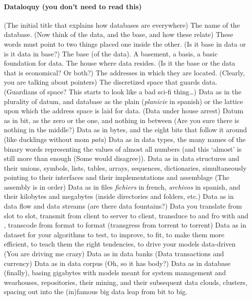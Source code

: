 




\paragraph{Dataloquy (you don't need to read this)}
(The initial title that explains how databases are everywhere) The name of the database. (Now think of the data, and the base, and how these relate) These words must point to two things placed one inside the other. (Is it base in data or is it data in base?) The base (of the data). A basement, a basis, a basic foundation for data. The house where data resides. (Is it the base or the data that is economical? Or both?) The addresses in which they are located. (Clearly, you are talking about pointers) The discretized space that guards data. (Guardians of space? This starts to look like a bad sci-fi thing\dots) Data as in the plurality of datum, and database as the plain (\textit{planicie} in spanish) or the lattice upon which the address space is laid for data. (Data under house arrest) Datum as in bit, as the zero or the one, and nothing in between (Are you sure there is nothing in the middle?) Data as in bytes, and the eight bits that follow it around (like ducklings without mom \textit{pata}) Data as in data types, the many names of the binary words representing the values of almost all numbers (and this `almost' is still more than enough (Some would disagree)). Data as in data structures and their unions, symbols, lists, tables, arrays, sequences, dictionaries, simultaneously pointing to their interfaces and their implementations and assemblage (The assembly is in order) Data as in files \textit{fichiers} in french, \textit{archivos} in spanish, and their kilobytes and megabytes (inside directories and folders, etc.) Data as in data flow and data streams (are there data fountains?) Data you translate from slot to slot, transmit from client to server to client, transduce to and fro with  and , transcode from format to format (transgress from torrent to torrent) Data as in dataset for your algorithms to test, to improve, to fit, to make them more efficient, to teach them the right tendencies, to drive your models data-driven (You are driving me crazy) Data as in data banks (Data transactions and currency) Data as in data corpus (Oh, so it has body?) Data as in database (finally), basing gigabytes with models meant for system management and wearhouses, repositories, their mining, and their subsequent data clouds, clusters, spacing out into the (in)famous big data leap from bit to big.





